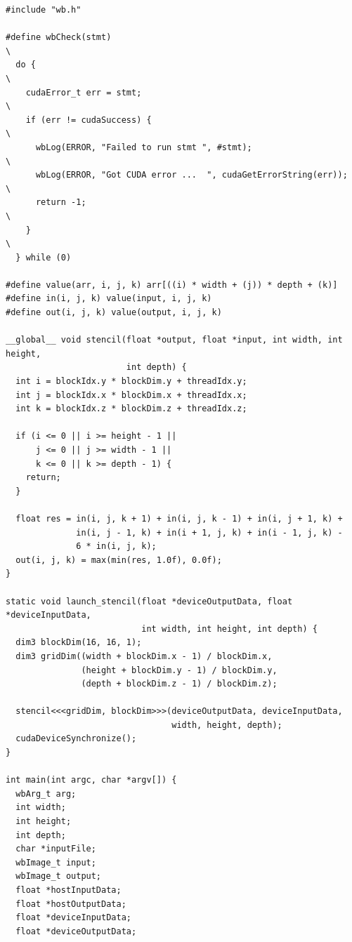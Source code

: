 \documentclass[14pt]{extarticle}
\newenvironment{code}{\captionsetup{type=listing, belowskip=-14pt plus 3pt minus 0pt}}{}
\begin{document}
\begin{code}    
\caption{Содержание rvs\_laboratories\_9/rvs\_laboratories\_9.cu\label{lst:main}}
\begin{verbatim}
#include "wb.h"

#define wbCheck(stmt)                                                          \
  do {                                                                         \
    cudaError_t err = stmt;                                                    \
    if (err != cudaSuccess) {                                                  \
      wbLog(ERROR, "Failed to run stmt ", #stmt);                              \
      wbLog(ERROR, "Got CUDA error ...  ", cudaGetErrorString(err));           \
      return -1;                                                               \
    }                                                                          \
  } while (0)

#define value(arr, i, j, k) arr[((i) * width + (j)) * depth + (k)]
#define in(i, j, k) value(input, i, j, k)
#define out(i, j, k) value(output, i, j, k)

__global__ void stencil(float *output, float *input, int width, int height,
                        int depth) {
  int i = blockIdx.y * blockDim.y + threadIdx.y;
  int j = blockIdx.x * blockDim.x + threadIdx.x;
  int k = blockIdx.z * blockDim.z + threadIdx.z;

  if (i <= 0 || i >= height - 1 ||
      j <= 0 || j >= width - 1 ||
      k <= 0 || k >= depth - 1) {
    return;
  }

  float res = in(i, j, k + 1) + in(i, j, k - 1) + in(i, j + 1, k) +
              in(i, j - 1, k) + in(i + 1, j, k) + in(i - 1, j, k) -
              6 * in(i, j, k);
  out(i, j, k) = max(min(res, 1.0f), 0.0f);
}

static void launch_stencil(float *deviceOutputData, float *deviceInputData,
                           int width, int height, int depth) {
  dim3 blockDim(16, 16, 1);
  dim3 gridDim((width + blockDim.x - 1) / blockDim.x,
               (height + blockDim.y - 1) / blockDim.y,
               (depth + blockDim.z - 1) / blockDim.z);

  stencil<<<gridDim, blockDim>>>(deviceOutputData, deviceInputData,
                                 width, height, depth);
  cudaDeviceSynchronize();
}

int main(int argc, char *argv[]) {
  wbArg_t arg;
  int width;
  int height;
  int depth;
  char *inputFile;
  wbImage_t input;
  wbImage_t output;
  float *hostInputData;
  float *hostOutputData;
  float *deviceInputData;
  float *deviceOutputData;


\end{verbatim}
\end{code}
\end{document}
